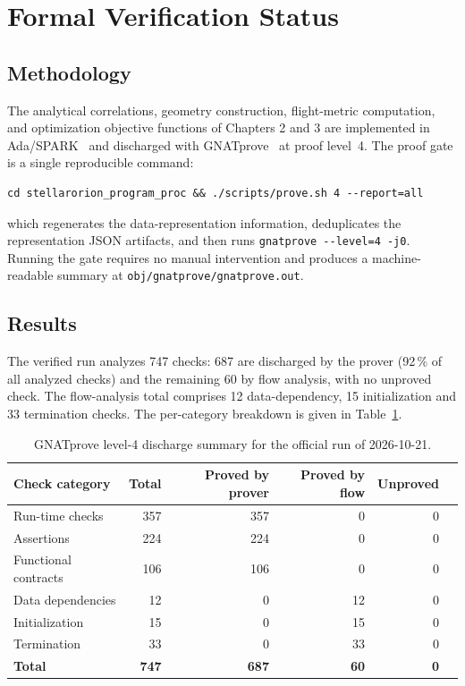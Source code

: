 \section{Formal Verification Status}
\label{app:formal_verification}

\subsection{Methodology}
The analytical correlations, geometry construction, flight-metric computation, and optimization objective functions of Chapters 2 and 3 are implemented in Ada/SPARK~\cite{spark2014language} and discharged with GNATprove~\cite{sparktools2024gnatprove} at proof level~4.\allowbreak{} The proof gate is a single reproducible command:
\begin{verbatim}
cd stellarorion_program_proc && ./scripts/prove.sh 4 --report=all
\end{verbatim}
which regenerates the data-representation information, deduplicates the representation JSON artifacts, and then runs \texttt{gnatprove -{}-level=4 -j0}. Running the gate requires no manual intervention and produces a machine-readable summary at \texttt{obj/gnatprove/gnatprove.out}.

\subsection{Results}
The verified run analyzes 747 checks: 687 are discharged by the prover (92\,\% of all analyzed checks) and the remaining 60 by flow analysis, with no unproved check. The flow-analysis total comprises 12 data-dependency, 15 initialization and 33 termination checks. The per-category breakdown is given in Table~\ref{tab:proof_summary}.

\begin{table}[H]
    \centering
    \caption{GNATprove level-4 discharge summary for the official run of 2026-10-21.}
    \label{tab:proof_summary}
    \begin{tabularx}{\textwidth}{l r r r r X}
        \toprule
        \textbf{Check category} & \textbf{Total} & \textbf{Proved by prover} & \textbf{Proved by flow} & \textbf{Unproved} \\
        \midrule
        Run-time checks & 357 & 357 & 0 & 0 \\
        Assertions & 224 & 224 & 0 & 0 \\
        Functional contracts & 106 & 106 & 0 & 0 \\
        Data dependencies & 12 & 0 & 12 & 0 \\
        Initialization & 15 & 0 & 15 & 0 \\
        Termination & 33 & 0 & 33 & 0 \\
        \midrule
        \textbf{Total} & \textbf{747} & \textbf{687} & \textbf{60} & \textbf{0} \\
        \bottomrule
    \end{tabularx}
\end{table}

